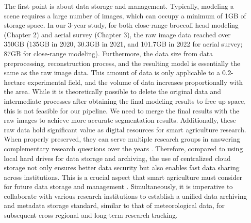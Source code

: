   The first point is about data storage and management. 
  Typically, modeling a scene requires a large number of images, which can occupy a minimum of 1GB of storage space. 
  In our 3-year study, for both close-range broccoli head modeling (Chapter 2) and aerial survey (Chapter 3), the raw image data reached over 350GB 
  (135GB in 2020, 30.3GB in 2021, and 101.7GB in 2022 for aerial survey; 87GB for close-range modeling). 
  Furthermore, the data size from data preprocessing, reconstruction process, and the resulting model is essentially the same as the raw image data. 
  This amount of data is only applicable to a 0.2-hectare experimental field, and the volume of data increases proportionally with the area. 
  While it is theoretically possible to delete the original data and intermediate processes after obtaining the final modeling results to free up space, this is not feasible for our pipeline. 
  We need to merge the final results with the raw images to achieve more accurate segmentation results. 
  Additionally, these raw data hold significant value as digital resources for smart agriculture research. 
  When properly preserved, they can serve multiple research groups in answering complementary research questions over the years \mbox{\citep{guo_uas_2021}}. 
  Therefore, compared to using local hard drives for data storage and archiving, the use of centralized cloud storage not only ensures better data security but also enables fast data sharing across institutions. 
  This is a crucial aspect that smart agriculture must consider for future data storage and management \mbox{\citep{guo_uas_2021}}. 
  Simultaneously, it is imperative to collaborate with various research institutions to establish a unified data archiving and metadata storage standard, similar to that of meteorological data, for subsequent cross-regional and long-term research tracking.





